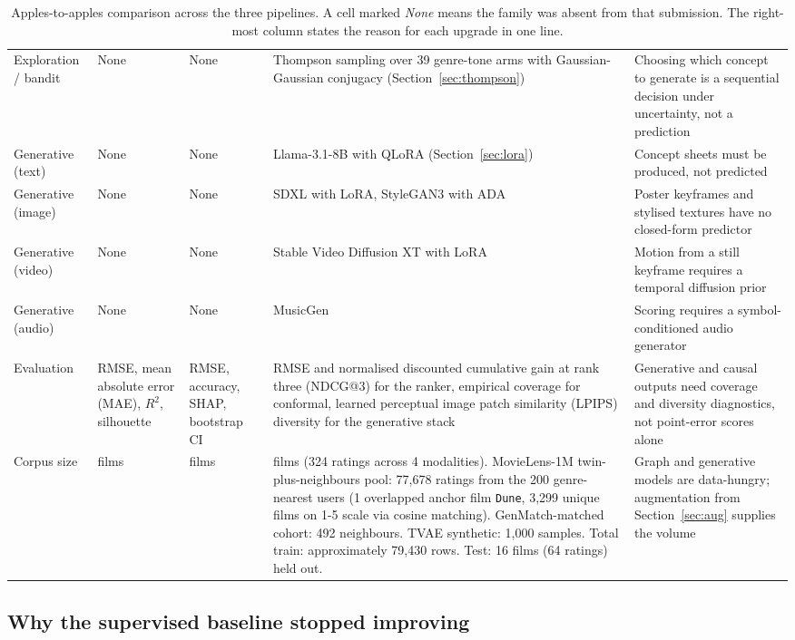 \documentclass{article}
\begin{document}
\begin{table}[!htbp]
\begin{tabular}{>{\raggedright\arraybackslash}p{2.4cm}>{\raggedright\arraybackslash}p{2.7cm}>{\raggedright\arraybackslash}p{2.7cm}>{\raggedright\arraybackslash}p{2.8cm}>{\raggedright\arraybackslash}p{3.0cm}}
Exploration / bandit & None & None & Thompson sampling over 39 genre-tone arms with Gaussian-Gaussian conjugacy (Section~\ref{sec:thompson}) & Choosing which concept to generate is a sequential decision under uncertainty, not a prediction \\
Generative (text) & None & None & Llama-3.1-8B with QLoRA (Section~\ref{sec:lora}) & Concept sheets must be produced, not predicted \\
Generative (image) & None & None & SDXL with LoRA, StyleGAN3 with ADA & Poster keyframes and stylised textures have no closed-form predictor \\
Generative (video) & None & None & Stable Video Diffusion XT with LoRA & Motion from a still keyframe requires a temporal diffusion prior \\
Generative (audio) & None & None & MusicGen & Scoring requires a symbol-conditioned audio generator \\
Evaluation & RMSE, mean absolute error (MAE), $R^2$, silhouette & RMSE, accuracy, SHAP, bootstrap CI & RMSE and normalised discounted cumulative gain at rank three (NDCG@3) for the ranker, empirical coverage for conformal, learned perceptual image patch similarity (LPIPS) diversity for the generative stack & Generative and causal outputs need coverage and diversity diagnostics, not point-error scores alone \\
Corpus size & 142 films & 142 films & 81 films (324 ratings across 4 modalities). MovieLens-1M twin-plus-neighbours pool: 77{,}678 ratings from the 200 genre-nearest users (1 overlapped anchor film \texttt{Dune}, 3{,}299 unique films on 1-5 scale via cosine matching). GenMatch-matched cohort: 492 neighbours. TVAE synthetic: 1{,}000 samples. Total train: approximately 79{,}430 rows. Test: 16 films (64 ratings) held out. & Graph and generative models are data-hungry; augmentation from Section~\ref{sec:aug} supplies the volume \\
\bottomrule
\end{tabular}
\caption{Apples-to-apples comparison across the three pipelines. A cell marked \emph{None} means the family was absent from that submission. The right-most column states the reason for each upgrade in one line.}
\label{tab:compare}
\end{table}

\subsection{Why the supervised baseline stopped improving}
\end{document}
